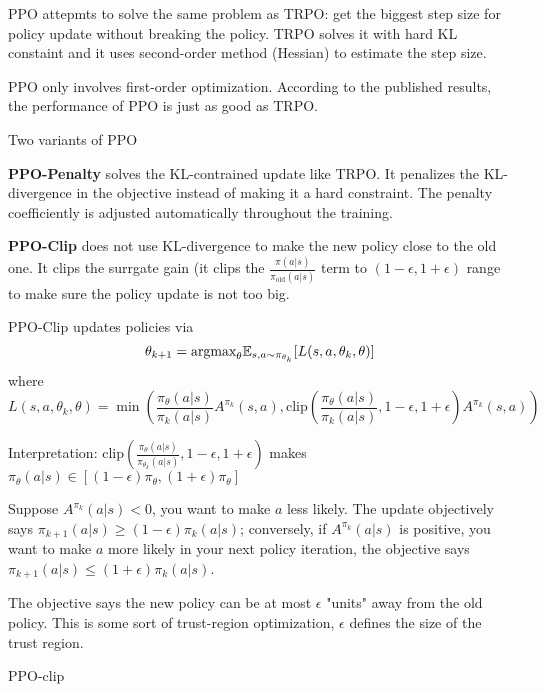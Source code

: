 \documentclass{article}
\begin{document}
PPO attepmts to solve the same problem as TRPO: get the biggest step
size for policy update without breaking the policy. TRPO solves it 
with hard KL constaint and it uses second-order method (Hessian) to
estimate the step size. 

PPO only involves first-order optimization. According to the published
results, the performance of PPO is just as good as TRPO. 

Two variants of PPO

\textbf{PPO-Penalty} solves the KL-contrained update like TRPO. It 
penalizes the KL-divergence in the objective instead of making it a 
hard constraint. The penalty coefficiently is adjusted automatically 
throughout the training. 

\textbf{PPO-Clip} does not use KL-divergence to make the new policy 
close to the old one. It clips the surrgate gain (it clips the 
$\frac{\pi(a|s)}{\pi_{\text{old}}(a|s)}$ term to $(1 - \epsilon, 
1 + \epsilon)$ range to make sure the policy update is not too big. 

PPO-Clip updates policies via
\[
\theta_{k+1} = \text{argmax}_{\theta}\mathbb{E}_{s, a\sim \pi_{\theta_k}}
[L(s, a, \theta_k, \theta)]
\]
where 
\[
L(s, a, \theta_k, \theta) = \min(
\frac{\pi_{\theta}(a|s)}{\pi_k(a|s)}A^{\pi_k}(s, a), \text{clip}(
\frac{\pi_{\theta}(a|s)}{\pi_k(a|s)}, 1-\epsilon, 1 + \epsilon)
A^{\pi_k}(s, a))
\]

Interpretation:
$\text{clip}(\frac{\pi_{\theta}(a|s)}{\pi_{\theta_k}(a|s)}, 
1-\epsilon, 1 + \epsilon)$ makes 
$\pi_{\theta}(a|s) \in [(1-\epsilon)\pi_{\theta}, (1+\epsilon)
\pi_{\theta}]$

Suppose $A^{\pi_k}(a|s) <0$, you want to make $a$ less likely. The 
update objectively says $\pi_{k+1}(a|s) \geq (1-\epsilon)\pi_k(a|s)$;
conversely, if $A^{\pi_k}(a|s)$ is positive, you want to make $a$
more likely in your next policy iteration, the objective says
$\pi_{k+1}(a|s) \leq (1 + \epsilon)\pi_k(a|s)$.

The objective says the new policy can be at most $\epsilon$ "units" 
away from the old policy. This is some sort of trust-region 
optimization, $\epsilon$ defines the size of the trust region.  

\begin{algorithm}[H]
\caption{PPO-clip}
\label{alg1}
\end{algorithm}
\end{document}

